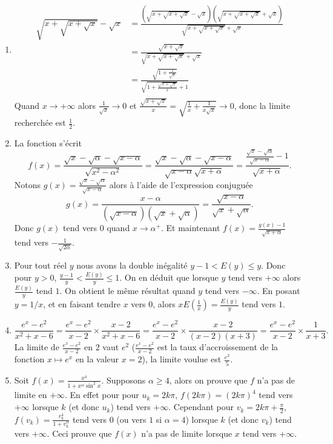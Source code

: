 \documentclass[11pt,a4paper]{article}
\begin{document}
\begin{enumerate}
  \item 
\begin{align*}
\sqrt{x+\sqrt{x+\sqrt x}}-\sqrt x 
  &= \frac{\left(\sqrt{x+\sqrt{x+\sqrt x}}-\sqrt x\right)\left(\sqrt{x+\sqrt{x+\sqrt x}}+\sqrt x\right)}{\sqrt{x+\sqrt{x+\sqrt x}}+\sqrt x} \\
  &= \frac{\sqrt{x+\sqrt x}}{\sqrt{x+\sqrt{x+\sqrt x}}+\sqrt x} \\
 &= \frac{\sqrt{1+\frac 1 {\sqrt x}}}{\sqrt{1+\frac{\sqrt{x+\sqrt x}}{x}}+1} \\
\end{align*}
Quand $x \rightarrow +\infty$ alors $\frac 1 {\sqrt x} \rightarrow 0$
et $\frac{\sqrt{x+\sqrt x}}{x}=\sqrt{\frac 1x + \frac{1}{x\sqrt{x}}}\rightarrow 0$, donc la limite recherch\'ee 
est $\frac 12$.
  \item La fonction s'\'ecrit 
$$f(x) = \frac{\sqrt{x}-\sqrt{\alpha}-\sqrt{x-\alpha}}{\sqrt{x^2-\alpha^2}} = \frac{\sqrt x - \sqrt \alpha - \sqrt{x-\alpha}}{\sqrt{x-\alpha}\sqrt{x+\alpha}} = 
\frac{\frac{\sqrt x - \sqrt \alpha}{\sqrt{x-\alpha}}-1}{\sqrt{x+\alpha}}.$$
Notons $g(x) = \frac{\sqrt x - \sqrt \alpha}{\sqrt{x-\alpha}}$ alors 
\`a l'aide de l'expression conjugu\'ee $$g(x) = \frac{x -  \alpha}{(\sqrt{x-\alpha})(\sqrt x +\sqrt \alpha)} = \frac{\sqrt{x -  \alpha}}{\sqrt x +\sqrt \alpha}.$$
Donc $g(x)$ tend vers $0$ quand $x \rightarrow \alpha^+$. Et maintenant 
$f(x) = \frac{g(x)-1}{\sqrt{x+\alpha}}$ tend vers $-\frac {1}{\sqrt{2 \alpha}}$.
  \item Pour tout r\'eel $y$ nous avons la double in\'egalit\'e $y-1 < E(y) \leq y$. Donc pour $y>0$,
$\frac{y-1}{y} < \frac{E(y)}{y} \leq 1$.
On en d\'eduit que lorsque $y$ tend vers $+\infty$  alors
$\frac{E(y)}{y}$ tend $1$. On obtient le même résultat quand $y$ tend vers $-\infty$. 
En posant $y = 1/x$, et en faisant tendre
$x$ vers $0$, alors $xE(\frac 1x) = \frac{E(y)}{y}$ tend vers $1$.
  \item 
$$\frac {e^x-e^2}{x^2+x-6} = \frac {e^x-e^2}{x-2} \times \frac{x-2}{x^2+x-6} =\frac {e^x-e^2}{x-2} \times \frac{x-2}{(x-2)(x+3)} = \frac {e^x-e^2}{x-2} \times \frac{1}{x+3}.$$
La limite de $\frac {e^x-e^2}{x-2}$ en $2$ vaut $e^2$ ($\frac {e^x-e^2}{x-2}$ est la taux d'accroissement de la fonction $x \mapsto e^x$ en la valeur $x=2$), la limite voulue est $\frac {e^2}{5}$.

  \item Soit $f(x) = \frac{x^4}{1+x^\alpha\sin^2x}$. Supposons $\alpha \geq 4$, alors on prouve que $f$ n'a pas de limite en $+\infty$.
En effet pour pour $u_k = 2k\pi$, $f(2k\pi) = (2k\pi)^4$ tend vers $+\infty$ lorsque $k$ (et donc $u_k$) tend vers $+\infty$.
Cependant pour $v_k = 2k\pi + \frac\pi 2$, $f(v_k) = \frac{v_k^4}{1+v_k^\alpha}$ tend vers $0$ (ou vers $1$ si $\alpha = 4$) lorsque $k$ (et donc $v_k$) tend vers $+\infty$. Ceci prouve que $f(x)$ n'a pas de limite lorsque $x$ tend vers $+\infty$.


\end{enumerate}
\end{document}
